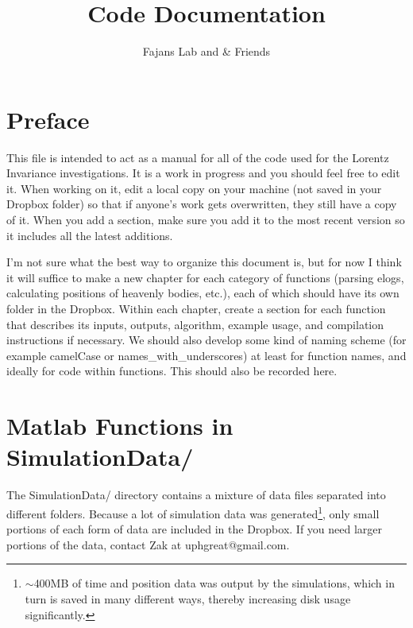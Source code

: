 \documentclass[12pt]{report}
\author{Fajans Lab and \& Friends}
\title{Code Documentation}
\begin{document}
\maketitle

\chapter*{Preface}
This file is intended to act as a manual for all of the code used for the Lorentz Invariance investigations.  It is a work in progress and you should feel free to edit it.  When working on it, edit a local copy on your machine (not saved in your Dropbox folder) so that if anyone's work gets overwritten, they still have a copy of it.  When you add a section, make sure you add it to the most recent version so it includes all the latest additions.

I'm not sure what the best way to organize this document is, but for now I think it will suffice to make a new chapter for each category of functions (parsing elogs, calculating positions of heavenly bodies, etc.), each of which should have its own folder in the Dropbox.  Within each chapter, create a section for each function that describes its inputs, outputs, algorithm, example usage, and compilation instructions if necessary.  We should also develop some kind of naming scheme (for example camelCase or names\_with\_underscores) at least for function names, and ideally for code within functions.  This should also be recorded here.


\tableofcontents



\chapter{Matlab Functions in SimulationData/}
The SimulationData/ directory contains a mixture of data files separated into different folders.  Because a lot of simulation data was generated\footnote{${\sim}$400MB of time and position data was output by the simulations, which in turn is saved in many different ways, thereby increasing disk usage significantly.}, only small portions of each form of data are included in the Dropbox.  If you need larger portions of the data, contact Zak at uphgreat@gmail.com.
\end{document}

